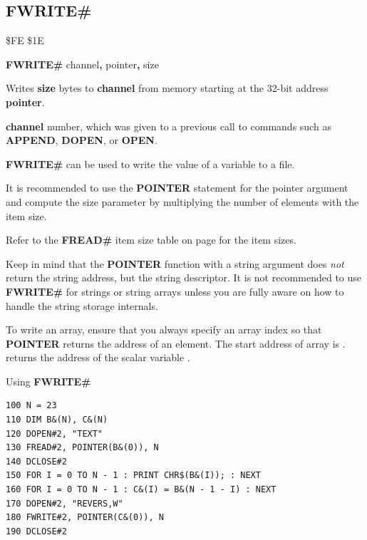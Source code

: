 \subsection{FWRITE\#}
\begin{description}[leftmargin=2cm,style=nextline]
\item [Token:]    \$FE \$1E

\item [Format:]   {\bf FWRITE\#} channel{\bf,} pointer{\bf,} size

\item [Usage:]    Writes {\bf size} bytes to {\bf channel} from memory starting at the 32-bit address {\bf pointer}.

                  {\bf channel} number, which was given to a previous call to commands such as {\bf APPEND}, {\bf DOPEN}, or {\bf OPEN}.

                  {\bf FWRITE\#} can be used to write the value of a variable to a file.

                  It is recommended to use the {\bf POINTER} statement for the pointer argument and compute the size parameter by multiplying the number of elements with the item size.

                  Refer to the {\bf FREAD\#} item size table on page \pageref{freadtable} for the item sizes.

\item [Remarks:]  Keep in mind that the {\bf POINTER} function with a string argument does {\em not} return the string address, but the string descriptor. It is not recommended to use {\bf FWRITE\#} for strings or string arrays unless you are fully aware on how to handle the string storage internals.

                  To write an array, ensure that you always specify an array index so that {\bf POINTER} returns the address of an element. The start address of array  is .  returns the address of the scalar variable .

\item [Example:]  Using {\bf FWRITE\#}

\begin{tcolorbox}[colback=black,coltext=white]
\verbatimfont{\codefont}
\begin{verbatim}
100 N = 23
110 DIM B&(N), C&(N)
120 DOPEN#2, "TEXT"
130 FREAD#2, POINTER(B&(0)), N
140 DCLOSE#2
150 FOR I = 0 TO N - 1 : PRINT CHR$(B&(I)); : NEXT
160 FOR I = 0 TO N - 1 : C&(I) = B&(N - 1 - I) : NEXT
170 DOPEN#2, "REVERS,W"
180 FWRITE#2, POINTER(C&(0)), N
190 DCLOSE#2
\end{verbatim}
\end{tcolorbox}
\end{description}

